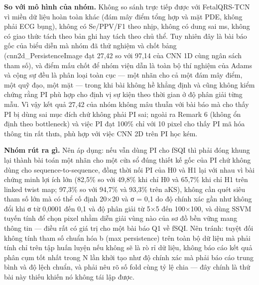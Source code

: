\documentclass[12pt,a4paper]{article}
\begin{document}
\noindent \textbf{\color{tdtblue}So với mô hình của nhóm.} Không so sánh trực tiếp được với FetalQRS-TCN vì miền dữ liệu hoàn toàn khác (đám mây điểm tổng hợp và mặt PDE, không phải ECG bụng), không có Se/PPV/F1 theo nhịp, không có dung sai ms, không có giao thức tách theo bản ghi hay tách theo chủ thể. Tuy nhiên đây là bài báo gốc của biểu diễn mà nhóm đã thử nghiệm và chốt bảng (cnn2d\_PersistenceImage đạt 27,42 so với 97,14 của CNN 1D cùng ngân sách tham số), và điểm mấu chốt để nhóm viện dẫn là toàn bộ thí nghiệm của Adams và cộng sự đều là phân loại toàn cục — một nhãn cho cả một đám mây điểm, một quỹ đạo, một mặt — trong khi bài không hề khẳng định và cũng không kiểm chứng rằng PI phù hợp cho định vị sự kiện theo thời gian ở độ phân giải từng mẫu. Vì vậy kết quả 27,42 của nhóm không mâu thuẫn với bài báo mà cho thấy PI bị dùng sai mục đích chứ không phải PI sai; ngoài ra Remark 6 (không ổn định theo bottleneck) và việc PI đạt 100\% chỉ với 10 pixel cho thấy PI mã hóa thông tin rất thưa, phù hợp với việc CNN 2D trên PI học kém.\par\vspace{3pt}
\noindent \textbf{\color{tdtblue}Nhóm rút ra gì.} Nên áp dụng: nếu vẫn dùng PI cho fSQI thì phải đóng khung lại thành bài toán một nhãn cho một cửa sổ đúng thiết kế gốc của PI chứ không dùng cho sequence-to-sequence, đồng thời nối PI của H0 và H1 lại với nhau vì bài chứng minh lợi ích lớn (82,5\% so với 49,8\% khi chỉ H0 và 65,7\% khi chỉ H1 trên linked twist map; 97,3\% so với 94,7\% và 93,3\% trên aKS), không cần quét siêu tham số lớn mà có thể cố định 20×20 và σ = 0,1 do độ chính xác gần như không đổi khi σ từ 0,0001 đến 0,1 và độ phân giải từ 5×5 đến 100×100, và dùng SSVM tuyến tính để chọn pixel nhằm diễn giải vùng nào của sơ đồ bền vững mang thông tin — điều rất có giá trị cho một bài báo Q1 về fSQI. Nên tránh: tuyệt đối không tính tham số chuẩn hóa b (max persistence) trên toàn bộ dữ liệu mà phải tính chỉ trên tập huấn luyện nếu không sẽ là rò rỉ dữ liệu, không báo cáo kết quả phân cụm tốt nhất trong N lần khởi tạo như độ chính xác mà phải báo cáo trung bình và độ lệch chuẩn, và phải nêu rõ số fold cùng tỷ lệ chia — đây chính là thứ bài này thiếu khiến nó không tái lập được.\par\vspace{3pt}
\vspace{6pt}
\end{document}
